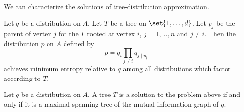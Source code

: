 

We can characterize the solutions of tree-distribution approximation.


\begin{prop}

  Let $q$ be a distribution on $A$. Let $T$ be
  a tree on $\set{1, \dots, d}$. Let $p_j$ be
  the parent of vertex $j$ for the $T$ rooted
  at vertex $i$, $j = 1,\dots,n$ and $j \neq i$.
  Then the distribution $p$ on $A$ defined by
  \[
    p = q_i \prod_{j \neq i} q_{j \mid p_j}
  \]
  achieves minimum entropy relative to $q$ among
  all distributions which factor according to $T$.

\end{prop}

\begin{prop}

Let $q$ be a distribution on $A$.
A tree $T$ is a solution to the problem above if and only if it is a maximal spanning tree of the mutual information graph of $q$.

\end{prop}
